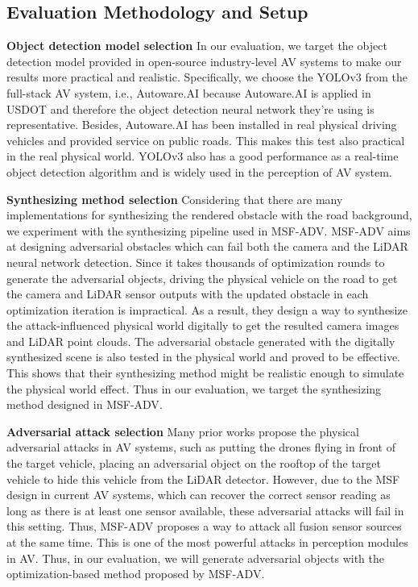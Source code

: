 \subsection{Evaluation Methodology and Setup}
\textbf{Object detection model selection}
In our evaluation, we target the object detection model provided in open-source industry-level AV systems to make our results more practical and realistic.
Specifically, we choose the YOLOv3\cite{yolo} from the full-stack AV system, i.e., Autoware.AI\cite{autoware} because Autoware.AI is applied in USDOT\cite{usdot} and therefore the object detection neural network they're using is representative. 
Besides, Autoware.AI has been installed in real physical driving vehicles and provided service on public roads\cite{autodrive}. 
This makes this test also practical in the real physical world. 
YOLOv3 also has a good performance as a real-time object detection algorithm and is widely used in the perception of AV system\cite{autoware}.

\textbf{Synthesizing method selection}
Considering that there are many implementations for synthesizing the rendered obstacle with the road background, we experiment with the synthesizing pipeline used in MSF-ADV\cite{msf-adv}. 
MSF-ADV\cite{msf-adv} aims at designing adversarial obstacles which can fail both the camera and the LiDAR neural network detection. 
Since it takes thousands of optimization rounds to generate the adversarial objects, 
driving the physical vehicle on the road to get the camera and LiDAR sensor outputs with the updated obstacle in each optimization iteration is impractical. 
As a result, they design a way to synthesize the attack-influenced physical world digitally to get the resulted camera images and LiDAR point clouds.
The adversarial obstacle generated with the digitally synthesized scene is also tested in the physical world and proved to be effective.
This shows that their synthesizing method might be realistic enough to simulate the physical world effect.
Thus in our evaluation, we target the synthesizing method designed in MSF-ADV\cite{msf-adv}.

\textbf{Adversarial attack selection}
Many prior works propose the physical adversarial attacks in AV systems, 
such as putting the drones flying in front of the target vehicle\cite{25}, placing an adversarial object on the rooftop of the target vehicle to hide this vehicle from the LiDAR detector\cite{19}. 
However, due to the MSF design in current AV systems, which can recover the correct sensor reading as long as there is at least one sensor available, these adversarial attacks will fail in this setting.
Thus, MSF-ADV\cite{msf-adv} proposes a way to attack all fusion sensor sources at the same time.
This is one of the most powerful attacks in perception modules in AV.
Thus, in our evaluation, we will generate adversarial objects with the optimization-based method proposed by MSF-ADV\cite{msf-adv}.

